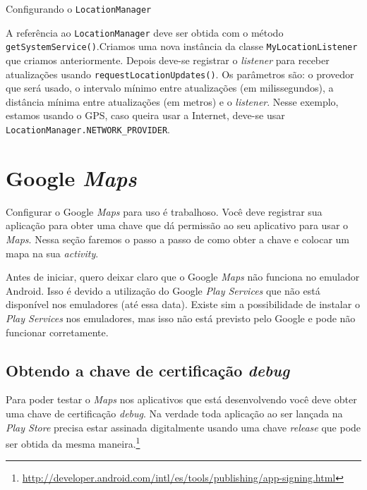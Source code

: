 \documentclass[a4paper,12pt,brazil,oneside]{book}
\begin{document}
		\begin{listing}[H]
		\inputminted[linenos=true,fontsize=\small,frame=lines, framesep=2mm, tabsize=2,numbersep=5pt]{java}{src/api/maps/locmanager.java}
		\caption{Configurando o \texttt{LocationManager}}
		\label{code:locationmanager}
		\end{listing} 	

		A referência ao \texttt{LocationManager} deve ser obtida com o método \\ \texttt{getSystemService()}.Criamos uma nova instância da classe \texttt{MyLocationListener} que criamos anteriormente. Depois deve-se registrar o \emph{listener} para receber atualizações usando \texttt{requestLocationUpdates()}. Os parâmetros são: o provedor que será usado, o intervalo mínimo entre atualizações (em milissegundos), a distância mínima entre atualizações (em metros) e o \emph{listener}. Nesse exemplo, estamos usando o GPS, caso queira usar a Internet, deve-se usar \\ \texttt{LocationManager.NETWORK\_PROVIDER}.

 		\section{Google \emph{Maps}}

		Configurar o Google \emph{Maps} para uso é trabalhoso. Você deve registrar sua aplicação para obter uma chave que dá permissão ao seu aplicativo para usar o \emph{Maps}. Nessa seção faremos o passo a passo de como obter a chave e colocar um mapa na sua \emph{activity}.

		Antes de iniciar, quero deixar claro que o Google \emph{Maps} não funciona no emulador Android. Isso é devido a utilização do Google \emph{Play Services} que não está disponível nos emuladores (até essa data). Existe sim a possibilidade de instalar o \emph{Play Services} nos emuladores, mas isso não está previsto pelo Google e pode não funcionar corretamente. 

		\subsection{Obtendo a chave de certificação \emph{debug}}
		
		Para poder testar o \emph{Maps} nos aplicativos que está desenvolvendo você deve obter uma chave de certificação \emph{debug}. Na verdade toda aplicação ao ser lançada na \emph{Play Store} precisa estar assinada digitalmente usando uma chave \emph{release} que pode ser obtida da mesma maneira.\footnote{\href{http://developer.android.com/intl/es/tools/publishing/app-signing.html}{http://developer.android.com/intl/es/tools/publishing/app-signing.html}}
\end{document}
